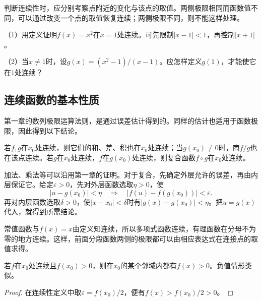 判断连续性时，应分别考察点附近的变化与该点的取值。两侧极限相同而函数值不同，可以通过改变一个点的取值恢复连续；两侧极限不同，则不能这样处理。

\begin{exercise}
\mbox{}\par\nobreak

（1）用定义证明\(f(x)=x^2\)在\(x=1\)处连续。可先限制\(|x-1|<1\)，再控制\(|x+1|\)。

（2）当\(x\ne1\)时，设\(g(x)=(x^2-1)/(x-1)\)。应怎样定义\(g(1)\)，才能使它在\(1\)处连续？

\end{exercise}

\subsection{连续函数的基本性质}
\label{subsec:functions-continuity-properties}

第一章的数列极限运算法则，是通过误差估计得到的。同样的估计也适用于函数极限，因此得到以下结论。

\begin{theorem}\label{thm:functions-continuity-operations}
若\(f,g\)在\(x_0\)处连续，则它们的和、差、积也在\(x_0\)处连续；当\(g(x_0)\ne0\)时，商\(f/g\)也在该点连续。若\(g\)在\(x_0\)处连续，\(f\)在\(g(x_0)\)处连续，则复合函数\(f\circ g\)在\(x_0\)处连续。
\end{theorem}

加法、乘法等可以沿用第一章的证明。对于复合，先确定外层允许的误差，再由内层保证它。给定\(\varepsilon>0\)，先对外层函数选取\(\eta>0\)，使
\begin{equation*}
 |u-g(x_0)|<\eta\quad\Longrightarrow\quad
 |f(u)-f(g(x_0))|<\varepsilon.
\end{equation*}
再对内层函数选取\(\delta>0\)，使\(|x-x_0|<\delta\)时有\(|g(x)-g(x_0)|<\eta\)。把\(u=g(x)\)代入，就得到所需结论。

常值函数与\(f(x)=x\)由定义知连续，所以多项式函数连续，有理函数在分母不为零的地方连续。这样，前面分段函数两侧的极限都可以由相应表达式在连接点的取值求得。

\begin{proposition}[局部保号性]\label{prop:functions-continuity-sign}
若\(f\)在\(x_0\)处连续且\(f(x_0)>0\)，则在\(x_0\)的某个邻域内都有\(f(x)>0\)。负值情形类似。
\end{proposition}

\begin{proof}
在连续性定义中取\(\varepsilon=f(x_0)/2\)，便有\(f(x)>f(x_0)/2>0\)。
\end{proof}

